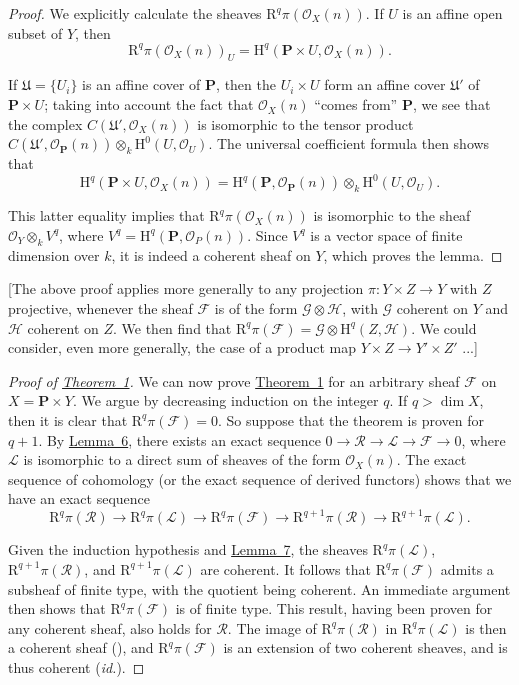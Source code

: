 \documentclass{article}
\theoremstyle{plain}
\theoremstyle{definition}
\newcommand{\scr}[1]{{\mathscr{#1}}}
\newcommand{\HH}{\mathrm{H}}
\newcommand{\RR}{\mathrm{R}}
\newcommand{\PP}{\mathbf{P}}
\newcommand{\oldpage}[1]{\marginpar{\footnotesize$\Big\vert$ \textit{p.~#1}}}
\begin{document}
\begin{proof}
  We explicitly calculate the sheaves $\RR^q\pi(\scr{O}_X(n))$.
  If $U$ is an affine open
  \oldpage{104}
  subset of $Y$, then
  \[
    \RR^q\pi(\scr{O}_X(n))_U = \HH^q(\PP\times U,\scr{O}_X(n)).
  \]

  If $\mathfrak{U}=\{U_i\}$ is an affine cover of $\PP$, then the $U_i\times U$ form an affine cover $\mathfrak{U}'$ of $\PP\times U$;
  taking into account the fact that $\scr{O}_X(n)$ ``comes from'' $\PP$, we see that the complex $C(\mathfrak{U}',\scr{O}_X(n))$ is isomorphic to the tensor product $C(\mathfrak{U}',\scr{O}_{\PP}(n))\otimes_k\HH^0(U,\scr{O}_U)$.
  The universal coefficient formula then shows that
  \[
    \HH^q(\PP\times U,\scr{O}_X(n)) = \HH^q(\PP,\scr{O}_{\PP}(n))\otimes_k\HH^0(U,\scr{O}_U).
  \]

  This latter equality implies that $\RR^q\pi(\scr{O}_X(n))$ is isomorphic to the sheaf $\scr{O}_Y\otimes_k V^q$, where $V^q=\HH^q(\PP,\scr{O}_P(n))$.
  Since $V^q$ is a vector space of finite dimension over $k$, it is indeed a coherent sheaf on $Y$, which proves the lemma.
\end{proof}

  [The above proof applies more generally to any projection $\pi\colon Y\times Z\to Y$ with $Z$ projective, whenever the sheaf $\scr{F}$ is of the form $\scr{G}\otimes\scr{H}$, with $\scr{G}$ coherent on $Y$ and $\scr{H}$ coherent on $Z$.
  We then find that $\RR^q\pi(\scr{F})=\scr{G}\otimes\HH^q(Z,\scr{H})$.
  We could consider, even more generally, the case of a product map $Y\times Z\to Y'\times Z'$ ...]

\begin{proof}[Proof of {\hyperref[theorem1]{Theorem~1}}]
  We can now prove \hyperref[theorem1]{Theorem~1} for an arbitrary sheaf $\scr{F}$ on $X=\PP\times Y$.
  We argue by decreasing induction on the integer $q$.
  If $q>\dim X$, then it is clear that $\RR^q\pi(\scr{F})=0$.
  So suppose that the theorem is proven for $q+1$.
  By \hyperref[lemma6]{Lemma~6}, there exists an exact sequence $0\to\scr{R}\to\scr{L}\to\scr{F}\to0$, where $\scr{L}$ is isomorphic to a direct sum of sheaves of the form $\scr{O}_X(n)$.
  The exact sequence of cohomology (or the exact sequence of derived functors) shows that we have an exact sequence
  \[
    \RR^q\pi(\scr{R}) \to
    \RR^q\pi(\scr{L}) \to
    \RR^q\pi(\scr{F}) \to
    \RR^{q+1}\pi(\scr{R}) \to
    \RR^{q+1}\pi(\scr{L}).
  \]

  Given the induction hypothesis and \hyperref[lemma7]{Lemma~7}, the sheaves $\RR^q\pi(\scr{L})$, $\RR^{q+1}\pi(\scr{R})$, and $\RR^{q+1}\pi(\scr{L})$ are coherent.
  It follows that $\RR^q\pi(\scr{F})$ admits a subsheaf of finite type, with the quotient being coherent.
  An immediate argument then shows that $\RR^q\pi(\scr{F})$ is of finite type.
  This result, having been proven for any coherent sheaf, also holds for $\scr{R}$.
  The image of $\RR^q\pi(\scr{R})$ in $\RR^q\pi(\scr{L})$ is then a coherent sheaf (\cite[p.~208]{12}), and $\RR^q\pi(\scr{F})$ is an extension of two coherent sheaves, and is thus coherent (\emph{id.}).
\end{proof}
\end{document}
